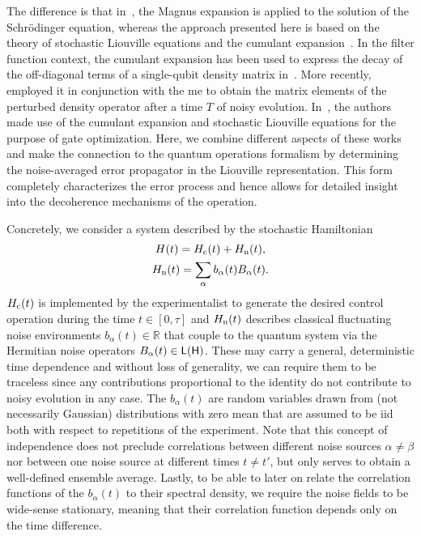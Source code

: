 The difference is that in~, the Magnus expansion is applied to the solution of the Schr\"odinger equation, whereas the approach presented here is based on the theory of stochastic Liouville equations and the cumulant expansion~\cite{Kubo1962,Kubo1963}.
In the filter function context, the cumulant expansion has been used to express the decay of the off-diagonal terms of a single-qubit density matrix in~.
More recently,~\citet{Paz-Silva2014} employed it in conjunction with the \gls{me} to obtain the matrix elements of the perturbed density operator after a time $T$ of noisy evolution.
In~, the authors made use of the cumulant expansion and stochastic Liouville equations for the purpose of gate optimization.
Here, we combine different aspects of these works and make the connection to the quantum operations formalism by determining the noise-averaged error propagator in the Liouville representation.
This form completely characterizes the error process and hence allows for detailed insight into the decoherence mechanisms of the operation.

Concretely, we consider a system described by the stochastic Hamiltonian
\begin{gather}
    H(t) = H_{\mathrm{c}}(t) + H_{\mathrm{n}}(t),\label{eq:ff:hamiltonian} \\
    H_{\mathrm{n}}(t) = \sum_\alpha b_\alpha(t) B_\alpha(t). \label{eq:ff:hamiltonian:noise}
\end{gather}
$H_{\mathrm{c}}(t)$ is implemented by the experimentalist to generate the desired control operation during the time $t\in [0, \tau]$ and $H_{\mathrm{n}}(t)$ describes classical fluctuating noise environments $b_\alpha(t)\in\mathbb{R}$ that couple to the quantum system via the Hermitian noise operators $B_\alpha(t)\in\mathsf{L}(\mathsf{H})$.
These may carry a general, deterministic time dependence and without loss of generality, we can require them to be traceless since any contributions proportional to the identity do not contribute to noisy evolution in any case.
The $b_\alpha(t)$ are random variables drawn from (not necessarily Gaussian) distributions with zero mean that are assumed to be \gls{iid} both with respect to repetitions of the experiment.
Note that this concept of independence does not preclude correlations between different noise sources $\alpha\neq\beta$ nor between one noise source at different times $t\neq t'$, but only serves to obtain a well-defined ensemble average.
Lastly, to be able to later on relate the correlation functions of the $b_\alpha(t)$ to their spectral density, we require the noise fields to be wide-sense stationary, meaning that their correlation function depends only on the time difference.

